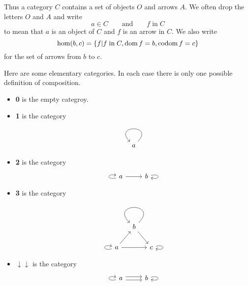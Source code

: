 Thus a category $C$ contains a set of objects $O$ and arrows $A$. We often drop the letters $O$ and $A$ and write
\[ a \in C \qquad \text{and}\qquad f\;\text{in}\; C \]
to mean that $a$ is an object of $C$ and $f$ is an arrow in $C$. We also write
\[ \hom(b,c) = \{f | f \;\text{in}\; C, \operatorname{dom} f = b , \operatorname{codom} f = c\} \]
for the set of arrows from $b$ to $c$.

\begin{example}
Here are some elementary categories. In each case there is only one possible definition of composition.
\begin{itemize}
\item \textbf{0} is the empty categroy.
\item \textbf{1} is the category
\[ \begin{tikzcd} a \arrow[loop] \end{tikzcd} \]
\item \textbf{2} is the category
\[ \begin{tikzcd}a \arrow[loop left] \rar{} & b\arrow[loop right] \end{tikzcd} \]
\item \textbf{3} is the category
\[ \begin{tikzcd}[column sep=small]
& b \arrow[dr]\arrow[loop] & \\
a \arrow[rr] \arrow[loop left] \arrow[ur] & & c \arrow[loop right]
\end{tikzcd} \]
\item $\downarrow\downarrow$ is the category
\[ \begin{tikzcd}a \arrow[loop left] \rar[shift left]\rar[shift right] & b \arrow[loop right]\end{tikzcd} \]
\end{itemize}
\end{example}

